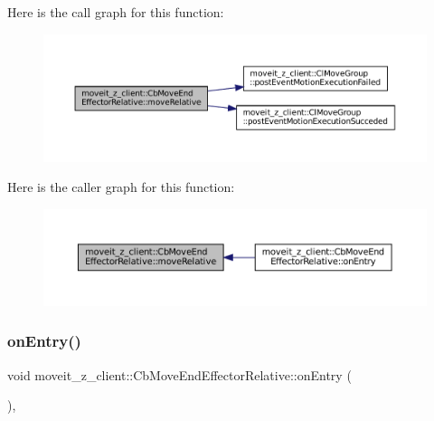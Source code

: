 Here is the call graph for this function\+:
\nopagebreak
\begin{figure}[H]
\begin{center}
\leavevmode
\includegraphics[width=350pt]{classmoveit__z__client_1_1CbMoveEndEffectorRelative_ae80ce575678a1f602d2fc1f68df1813f_cgraph}
\end{center}
\end{figure}
Here is the caller graph for this function\+:
\nopagebreak
\begin{figure}[H]
\begin{center}
\leavevmode
\includegraphics[width=350pt]{classmoveit__z__client_1_1CbMoveEndEffectorRelative_ae80ce575678a1f602d2fc1f68df1813f_icgraph}
\end{center}
\end{figure}
\mbox{\label{classmoveit__z__client_1_1CbMoveEndEffectorRelative_ae425a51d23933a13a87df9cd26f0fc99}} 
\subsubsection{\texorpdfstring{on\+Entry()}{onEntry()}}
{\footnotesize\ttfamily void moveit\+\_\+z\+\_\+client\+::\+Cb\+Move\+End\+Effector\+Relative\+::on\+Entry (\begin{DoxyParamCaption}{ }\end{DoxyParamCaption})\hspace{0.3cm}{\ttfamily [override]}, {\ttfamily [virtual]}}



